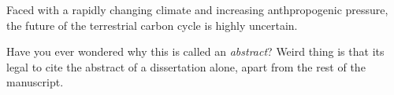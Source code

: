 
Faced with a rapidly changing climate and increasing anthpropogenic pressure, the future of the terrestrial carbon cycle is highly uncertain.


Have you ever wondered why this is called an \emph{abstract}? Weird thing is
that its legal to cite the abstract of a dissertation alone, apart from the
rest of the manuscript.
